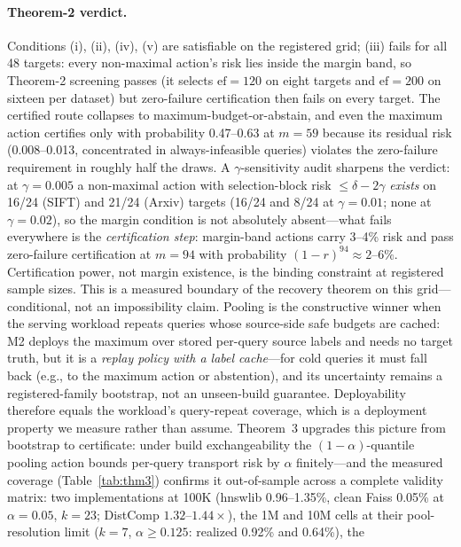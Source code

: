\documentclass{article}
\begin{document}
\paragraph{Theorem-2 verdict.}
Conditions (i), (ii), (iv), (v) are satisfiable on the registered grid; (iii) fails for all 48 targets:
every non-maximal action's risk lies inside the margin band, so Theorem-2 screening passes (it selects
$\mathrm{ef}{=}120$ on eight targets and $\mathrm{ef}{=}200$ on sixteen per dataset) but zero-failure
certification then fails on every target. The certified route collapses to
maximum-budget-or-abstain, and even the maximum action certifies only with probability 0.47--0.63 at
$m=59$ because its residual risk (0.008--0.013, concentrated in always-infeasible queries) violates the
zero-failure requirement in roughly half the draws. A $\gamma$-sensitivity audit sharpens the verdict: at
$\gamma{=}0.005$ a non-maximal action with selection-block risk $\le\delta-2\gamma$ \emph{exists} on
16/24 (SIFT) and 21/24 (Arxiv) targets (16/24 and 8/24 at $\gamma{=}0.01$; none at $\gamma{=}0.02$), so
the margin condition is not absolutely absent---what fails everywhere is the \emph{certification step}:
margin-band actions carry 3--4\% risk and pass zero-failure certification at $m{=}94$ with probability
$(1-r)^{94}\approx2$--$6\%$. Certification power, not margin existence, is the binding constraint at
registered sample sizes. This is a measured boundary of the recovery theorem on this grid---conditional,
not an impossibility claim. Pooling is the constructive winner when the serving workload repeats queries whose source-side safe
budgets are cached: M2 deploys the maximum over stored per-query source labels and needs no target truth,
but it is a \emph{replay policy with a label cache}---for cold queries it must fall back (e.g., to the
maximum action or abstention), and its uncertainty remains a registered-family bootstrap, not an
unseen-build guarantee. Deployability therefore equals the workload's query-repeat coverage, which is a
deployment property we measure rather than assume. Theorem~3 upgrades this picture from bootstrap to
certificate: under build exchangeability the $(1{-}\alpha)$-quantile pooling action bounds per-query
transport risk by $\alpha$ finitely---and the measured coverage (Table~\ref{tab:thm3}) confirms it
out-of-sample across a complete validity matrix: two implementations at 100K (hnswlib 0.96--1.35\%,
clean Faiss 0.05\% at $\alpha{=}0.05$, $k{=}23$; DistComp $1.32$--$1.44\times$), the 1M and 10M cells
at their pool-resolution limit ($k{=}7$, $\alpha{\ge}0.125$: realized 0.92\% and 0.64\%), the
\end{document}
